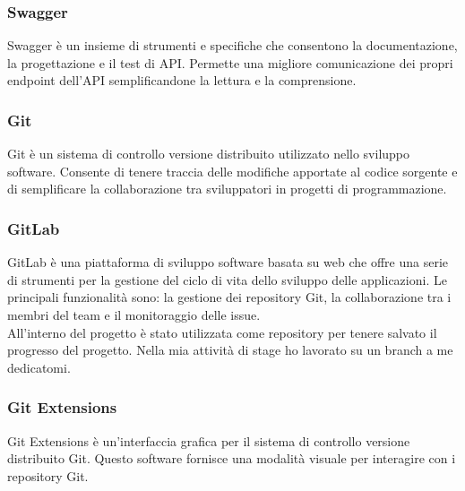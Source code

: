 \subsubsection*{Swagger}
Swagger è un insieme di strumenti e specifiche che consentono la documentazione, la progettazione e il test di API. Permette una migliore comunicazione dei propri endpoint dell'API semplificandone la lettura e la comprensione.\\

\subsubsection*{Git}
Git è un sistema di controllo versione distribuito utilizzato nello sviluppo software. Consente di tenere traccia delle modifiche apportate al codice sorgente e di semplificare la collaborazione tra sviluppatori in progetti di programmazione.\\


\subsubsection*{GitLab}
GitLab è una piattaforma di sviluppo software basata su web che offre una serie di strumenti per la gestione del ciclo di vita dello sviluppo delle applicazioni. Le principali funzionalità sono: la gestione dei repository Git, la collaborazione tra i membri del team e il monitoraggio delle issue.\\
All'interno del progetto è stato utilizzata come repository per tenere salvato il progresso del progetto. Nella mia attività di stage ho lavorato su un branch a me dedicatomi.\\

\subsubsection*{Git Extensions}
Git Extensions è un'interfaccia grafica per il sistema di controllo versione distribuito Git. Questo software fornisce una modalità visuale per interagire con i repository Git.



